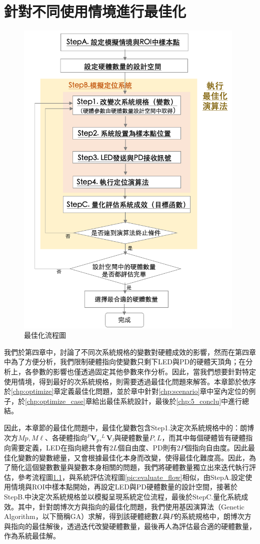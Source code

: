 \chapter{針對不同使用情境進行最佳化}
\label{chp:5}

\begin{figure}[htpb]
    \centering
    \includegraphics[width=11cm]{ch5pic/optimize_flow.png}
    \caption{最佳化流程圖}
    \label{pic:optimize_flow}
\end{figure}

我們於第四章中，討論了不同次系統規格的變數對硬體成效的影響，然而在第四章中為了方便分析，我們限制硬體指向使變數只剩下LED與PD的硬體天頂角；在分析上，各參數的影響也僅透過固定其他參數來作分析。因此，當我們想要針對特定使用情境，得到最好的次系統規格，則需要透過最佳化問題來解答。本章節於依序於\ref{chp:optimize}章定義最佳化問題，並於章中針對\ref{chp:scenario}章中室內定位的例子，於\ref{chp:optimize_case}章給出最佳系統設計，最後於\ref{chp:5_conclu}中進行總結。




因此，本章節的最佳化問題中，最佳化變數包含Step1.決定次系統規格中的：朗博次方$Mp,M\ell$、各硬體指向$^{P}\boldsymbol{V}_p,^{L}\boldsymbol{V}_l$與硬體數量$P,L$，而其中每個硬體皆有硬體指向需要定義，LED在指向總共會有$2L$個自由度、PD則有$2P$個指向自由度。因此最佳化變數的變數總量，又會根據最佳化本身而改變，使得最佳化難度高。因此，為了簡化這個變數數量與變數本身相關的問題，我們將硬體數量獨立出來迭代執行評估，參考流程圖\ref{pic:optimize_flow}，與系統評估流程圖\ref{pic:evaluate_flow}相似，由StepA.設定使用情境與ROI中樣本點開始，再設定LED與PD硬體數量的設計空間，接著於StepB.中決定次系統規格並以模擬呈現系統定位流程，最後於StepC.量化系統成效。其中，針對朗博次方與指向的最佳化問題，我們使用基因演算法（Genetic Algorithm，以下簡稱GA）求解，得到該硬體總數$L$與$P$的系統規格中，朗博次方與指向的最佳解後，透過迭代改變硬體數量，最後再人為評估最合適的硬體數量，作為系統最佳解。

